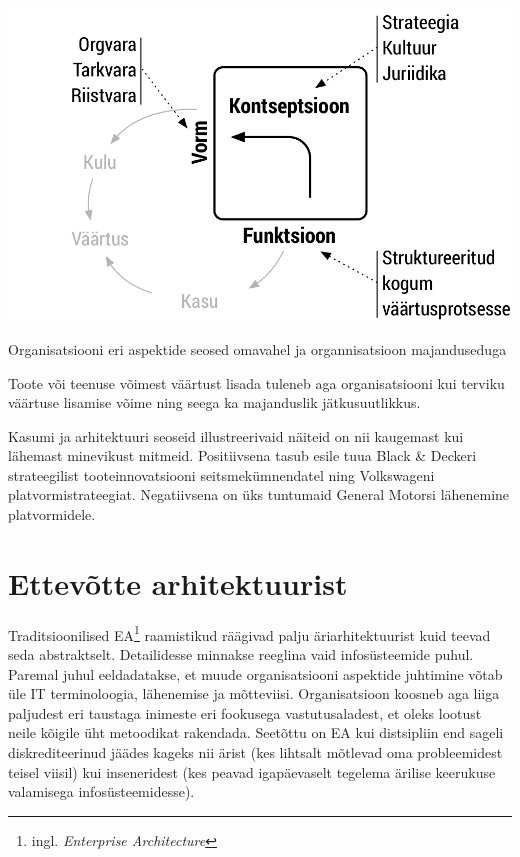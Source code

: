 \begin{marginfigure}
	\begin{center}
		\includegraphics[width=\linewidth]{ffc_profit.pdf}
		\caption{Organisatsiooni eri aspektide seosed omavahel ja organnisatsioon majanduseduga}
		\label{fig:arh}
	\end{center}
\end{marginfigure}

Toote või teenuse võimest väärtust lisada tuleneb aga organisatsiooni kui terviku väärtuse lisamise võime ning seega ka majanduslik jätkusuutlikkus. 

Kasumi ja arhitektuuri seoseid illustreerivaid näiteid on nii kaugemast kui lähemast minevikust mitmeid. Positiivsena tasub esile tuua Black \& Deckeri strateegilist tooteinnovatsiooni seitsmekümnendatel ning Volkswageni platvormistrateegiat. Negatiivsena on üks tuntumaid General Motorsi lähenemine platvormidele. 


\section{Ettevõtte arhitektuurist}
Traditsioonilised EA\footnote{ingl. \emph{Enterprise Architecture}} raamistikud räägivad palju äriarhitektuurist kuid teevad seda abstraktselt. Detailidesse minnakse reeglina vaid infosüsteemide puhul. Paremal juhul eeldadatakse, et muude organisatsiooni aspektide juhtimine võtab üle IT terminoloogia, lähenemise ja mõtteviisi. Organisatsioon koosneb aga liiga paljudest eri taustaga inimeste eri fookusega vastutusaladest, et oleks lootust neile kõigile üht metoodikat rakendada.  Seetõttu on EA kui distsipliin end sageli diskrediteerinud jäädes kageks nii ärist (kes lihtsalt mõtlevad oma probleemidest teisel viisil) kui inseneridest (kes peavad igapäevaselt tegelema ärilise keerukuse valamisega infosüsteemidesse). 

